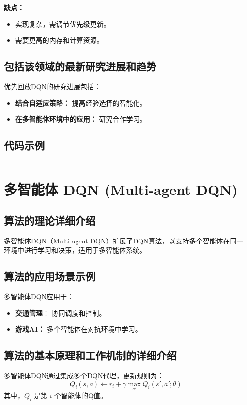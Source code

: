 \textbf{缺点：}
\begin{itemize}
    \item 实现复杂，需调节优先级更新。
    \item 需要更高的内存和计算资源。
\end{itemize}

\subsection*{包括该领域的最新研究进展和趋势}
优先回放DQN的研究进展包括：
\begin{itemize}
    \item \textbf{结合自适应策略：} 提高经验选择的智能化。
    \item \textbf{在多智能体环境中的应用：} 研究合作学习。
\end{itemize}
\subsection*{代码示例}
\begin{lstlisting}

\end{lstlisting}


\section{多智能体 DQN (Multi-agent DQN)}
\subsection*{算法的理论详细介绍}
多智能体DQN（Multi-agent DQN）扩展了DQN算法，以支持多个智能体在同一环境中进行学习和决策，适用于多智能体系统。

\subsection*{算法的应用场景示例}
多智能体DQN应用于：
\begin{itemize}
    \item \textbf{交通管理：} 协同调度和控制。
    \item \textbf{游戏AI：} 多个智能体在对抗环境中学习。
\end{itemize}

\subsection*{算法的基本原理和工作机制的详细介绍}
多智能体DQN通过集成多个DQN代理，更新规则为：
\[
    Q_i(s, a) \leftarrow r_i + \gamma \max_{a'} Q_i(s', a'; \theta)
\]
其中，\(Q_i\) 是第 \(i\) 个智能体的Q值。

